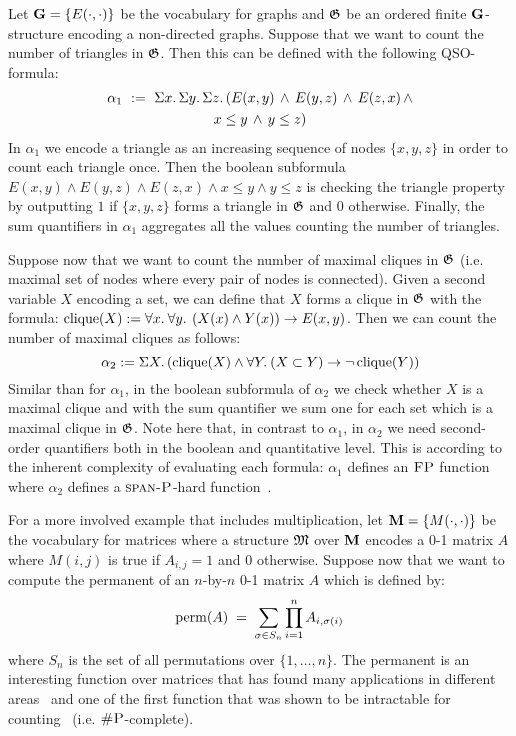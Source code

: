 \begin{example}
Let $\mathbf{G} = \{E(\cdot,\cdot)\}$ be the vocabulary for graphs and $\mathfrak{G}$ be an ordered finite $\mathbf{G}$-structure encoding a non-directed graphs. 
Suppose that we want to count the number of triangles in $\mathfrak{G}$. Then this can be defined with the following QSO-formula:
\begin{multline*}
\alpha_1 \ := \ \Sigma{x}.\, \Sigma{y}.\, \Sigma{z}.\, ( E(x,y) \, \wedge \, E(y,z) \, \wedge \, E(z,x) \, \wedge \\
x \leq y \, \wedge \, y \leq z )
\end{multline*}
In $\alpha_1$ we encode a triangle as an increasing sequence of nodes $\{x, y, z\}$ in order to count each triangle once. Then the boolean subformula  $E(x,y) \wedge E(y,z) \wedge E(z,x) \wedge
x \leq y \wedge y \leq z$ is checking the triangle property by outputting $1$ if $\{x, y, z\}$ forms a triangle in $\mathfrak{G}$ and $0$ otherwise.
Finally, the sum quantifiers in $\alpha_1$ aggregates all the values counting the number of triangles.

Suppose now that we want to count the number of maximal cliques in $\mathfrak{G}$ (i.e. maximal set of nodes where every pair of nodes is connected). Given a second variable $X$ encoding a set, we can define that $X$ forms a clique in $\mathfrak{G}$ with the formula:
$
\operatorname{clique}(X) := \forall{x}.\: \forall{y}.\: \left(X(x) \wedge Y(x)\right) \rightarrow E(x,y) 
$.
Then we can count the number of maximal cliques as follows:
$$
\alpha_2 := \Sigma{X}.\, (\operatorname{clique}(X) \wedge \forall{Y}.\: (X \subset Y) \rightarrow \neg \operatorname{clique}(Y) )
$$ 
Similar than for $\alpha_1$, in the boolean subformula of $\alpha_2$ we check whether $X$ is a maximal clique and with the sum quantifier we sum one for each set which is a maximal clique in $\mathfrak{G}$. 
Note here that, in contrast to $\alpha_1$, in $\alpha_2$ we need second-order quantifiers both in the boolean and quantitative level.
This is according to the inherent complexity of evaluating each formula: $\alpha_1$ defines an $\text{\sc FP}$ function where $\alpha_2$ defines a $\text{\sc span-P}$-hard function~\cite{paper-that-shows-that-this-problem-is-SPANPhard}.
\end{example}
\begin{example}
For a more involved example that includes multiplication, let $\mathbf{M} = \{M(\cdot,\cdot)\}$ be the vocabulary for matrices where a structure $\mathfrak{M}$ over $\mathbf{M}$ encodes a 0-1 matrix $A$ where $M(i,j)$ is true if $A_{i,j} = 1$ and $0$ otherwise. 
Suppose now that we want to compute the permanent of an $n$-by-$n$ 0-1 matrix $A$ which is defined by:
$$
\operatorname{perm}(A) \; = \; \sum_{\sigma \in S_n} \prod_{i=1}^n A_{i, \sigma(i)}  
$$
where $S_n$ is the set of all permutations over $\{1, \ldots, n\}$.
The permanent is an interesting function over matrices that has found many applications in different areas~\cite{permanent-applications} and one of the first function that was shown to be intractable for counting~\cite{Valiant79} (i.e. $\text{\sc \#P}$-complete).
\end{example}


